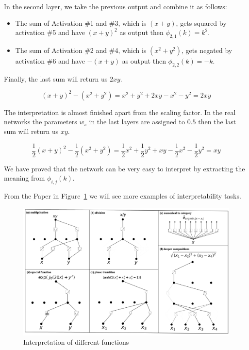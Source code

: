 In the second layer, we take the previous output and combine it as follows:
\begin{itemize}
    \item The sum of Activation \#1 and \#3, which is $(x+y)$, gets squared by activation \#5 and have $(x+y)^2$ as output then $\phi_{2,1}(k) = k^2$.

    \item The sum of Activation \#2 and \#4, which is $(x^2+y^2)$, gets negated by activation \#6 and have $-(x+y)$ as output then $\phi_{2,2}(k) = -k$.
\end{itemize}

Finally, the last sum will return us $2xy$.

$$(x+y)^2 - (x^2+y^2) = x^2+y^2 +2xy - x^2 -y^2 = 2xy   $$

The interpretation is almost finished apart from the scaling factor. In the real networks the parameters $w_s$ in the last layers are assigned to $0.5$ then the last sum will return us $xy$.

$$\frac{1}{2}(x+y)^2 - \frac{1}{2}(x^2+y^2) = \frac{1}{2}x^2+\frac{1}{2}y^2 +xy - \frac{1}{2}x^2 - \frac{1}{2}y^2 = xy   $$ 

We have proved that the network can be very easy to interpret by extracting the meaning from $\phi_{i,j}(k)$.

From the Paper \cite{KAN} in Figure~\ref{fig:interp2} we will see more examples of interpretability tasks.

\begin{figure}[H]
    \centering
    \includegraphics[width=0.8\linewidth]{LATEX//Images/interpr2.png}
    \caption{Interpretation of different functions}
    \label{fig:interp2}
\end{figure}